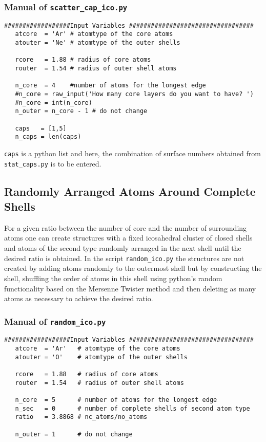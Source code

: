 \subsubsection{Manual of \lstinline|scatter_cap_ico.py|}
\begin{lstlisting}
##################Input Variables ##################################
   atcore  = 'Ar' # atomtype of the core atoms
   atouter = 'Ne' # atomtype of the outer shells
   
   rcore   = 1.88 # radius of core atoms
   router  = 1.54 # radius of outer shell atoms
   
   n_core  = 4    #number of atoms for the longest edge
   #n_core = raw_input('How many core layers do you want to have? ')
   #n_core = int(n_core)
   n_outer = n_core - 1 # do not change
   
   caps   = [1,5]
   n_caps = len(caps)
\end{lstlisting}
\verb|caps| is a python list and here, the combination of surface
numbers obtained from \verb|stat_caps.py| is to be entered.



\subsection{Randomly Arranged Atoms Around Complete Shells}
For a given ratio between the number of core and the number of surrounding
atoms one can create structures with a fixed icosahedral cluster of closed
shells and atoms
of the second type randomly arranged in the next shell until the desired
ratio is obtained.
In the script \lstinline|random_ico.py| the structures are not created
by adding atoms randomly to the outermost shell but by constructing the
shell, shuffling the order of atoms in this shell using python's random
functionality based on the Mersenne Twister method \cite{python_random,Matsumoto98}
and then deleting as many
atoms as necessary to achieve the desired ratio. 

\subsubsection{Manual of \lstinline|random_ico.py|}
\begin{lstlisting}
##################Input Variables ##################################
   atcore  = 'Ar'   # atomtype of the core atoms
   atouter = 'O'    # atomtype of the outer shells
   
   rcore   = 1.88   # radius of core atoms
   router  = 1.54   # radius of outer shell atoms
   
   n_core  = 5      # number of atoms for the longest edge
   n_sec   = 0      # number of complete shells of second atom type
   ratio   = 3.8868 # nc_atoms/no_atoms
   
   n_outer = 1      # do not change
\end{lstlisting}

